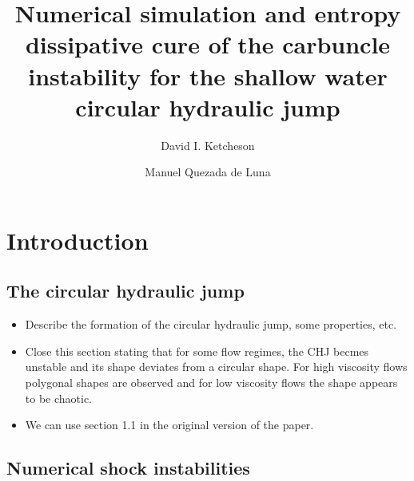 \documentclass[preprint, 11pt]{article}
\title{Numerical simulation and entropy dissipative cure of the 
  carbuncle instability for the shallow water circular hydraulic jump}
\author{
    David I. Ketcheson \and
    Manuel Quezada de Luna
}
\begin{document}
\maketitle

\begin{abstract}

\end{abstract}


\section{Introduction}

\subsection{The circular hydraulic jump}

\begin{itemize}
  \item Describe the formation of the circular hydraulic jump, some properties, etc. 
  \item Close this section stating that for some flow regimes, the CHJ becmes unstable and its 
    shape deviates from a circular shape. For high viscosity flows polygonal shapes are observed 
    and for low viscosity flows the shape appears to be chaotic. 
  \item We can use section 1.1 in the original version of the paper.
\end{itemize}

\subsection{Numerical shock instabilities}
\end{document}
